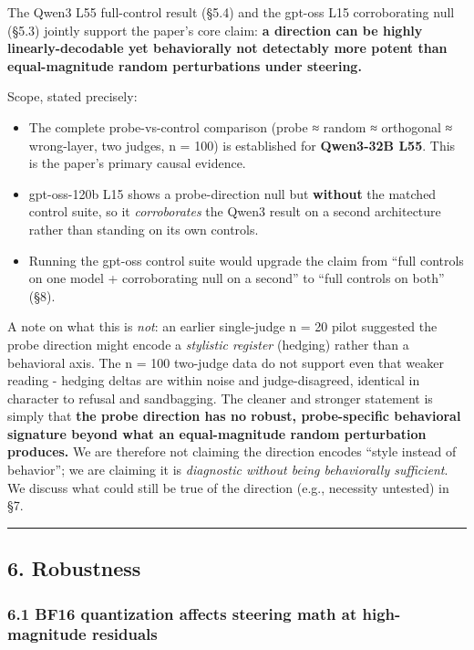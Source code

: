\documentclass[
]{article}
\providecommand{\tightlist}{%
  \setlength{\itemsep}{0pt}\setlength{\parskip}{0pt}}
\begin{document}
The Qwen3 L55 full-control result (§5.4) and the gpt-oss L15
corroborating null (§5.3) jointly support the paper's core claim:
\textbf{a direction can be highly linearly-decodable yet behaviorally
not detectably more potent than equal-magnitude random perturbations
under steering.}

Scope, stated precisely:

\begin{itemize}
\tightlist
\item
  The complete probe-vs-control comparison (probe ≈ random ≈ orthogonal
  ≈ wrong-layer, two judges, n = 100) is established for
  \textbf{Qwen3-32B L55}. This is the paper's primary causal evidence.
\item
  gpt-oss-120b L15 shows a probe-direction null but \textbf{without} the
  matched control suite, so it \emph{corroborates} the Qwen3 result on a
  second architecture rather than standing on its own controls.
\item
  Running the gpt-oss control suite would upgrade the claim from ``full
  controls on one model + corroborating null on a second'' to ``full
  controls on both'' (§8).
\end{itemize}

A note on what this is \emph{not}: an earlier single-judge n = 20 pilot
suggested the probe direction might encode a \emph{stylistic register}
(hedging) rather than a behavioral axis. The n = 100 two-judge data do
not support even that weaker reading - hedging deltas are within noise
and judge-disagreed, identical in character to refusal and sandbagging.
The cleaner and stronger statement is simply that \textbf{the probe
direction has no robust, probe-specific behavioral signature beyond what
an equal-magnitude random perturbation produces.} We are therefore not
claiming the direction encodes ``style instead of behavior''; we are
claiming it is \emph{diagnostic without being behaviorally sufficient}.
We discuss what could still be true of the direction (e.g., necessity
untested) in §7.

\begin{center}\rule{0.5\linewidth}{0.5pt}\end{center}

\subsection{6. Robustness}\label{robustness}

\subsubsection{6.1 BF16 quantization affects steering math at
high-magnitude
residuals}\label{bf16-quantization-affects-steering-math-at-high-magnitude-residuals}
\end{document}
